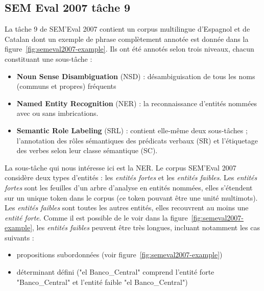 \documentclass[12pt,a4paper,times,twoside,openright]{report}
\begin{document}
        
        \subsection{SEM Eval 2007 tâche 9}
        \label{subsec:corpus-semeval2007}
La tâche 9 de SEM'Eval 2007 \citep{marquezSemEval2007} contient un corpus multilingue d'Espagnol et de Catalan dont un exemple de phrase complètement annotée est donnée dans la figure\ \ref{fig:semeval2007-example}. Ils ont été annotés selon trois niveaux, chacun constituant une sous-tâche :
\begin{itemize}
    \item \textbf{Noun Sense Disambiguation} (NSD) : désambiguisation de tous les noms (communs et propres) fréquents
    \item \textbf{Named Entity Recognition} (NER) : la reconnaissance d'entités nommées avec ou sans imbrications.
    \item \textbf{Semantic Role Labeling} (SRL) : contient elle-même deux sous-tâches ; l'annotation des rôles sémantiques des prédicats verbaux (SR) et l'étiquetage des verbes selon leur classe sémantique (SC).
\end{itemize}

La sous-tâche qui nous intéresse ici est la NER. Le corpus SEM'Eval 2007 considère deux types d'entités : les \emph{entités fortes} et les \emph{entités faibles}. Les \emph{entités fortes} sont les feuilles d'un arbre d'analyse en entités nommées, elles s'étendent sur un unique token dans le corpus (ce token pouvant être une unité multimots). Les \emph{entités faibles} sont toutes les autres entités, elles recouvrent au moins une \emph{entité forte}. Comme il est possible de le voir dans la figure\ \ref{fig:semeval2007-example}, les \emph{entités faibles} peuvent être très longues, incluant notamment les cas suivants :
\begin{itemize}
    \item propositions subordonnées (voir figure\ \ref{fig:semeval2007-example})
    \item déterminant défini ("el Banco\_Central" comprend l'entité forte "Banco\_Central" et l'entité faible "el Banco\_Central")
\end{itemize}
\end{document}
